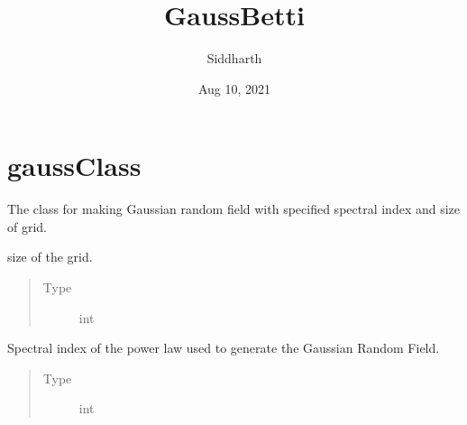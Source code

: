 \documentclass[letterpaper,10pt,english]{sphinxmanual}
\title{GaussBetti}
\date{Aug 10, 2021}
\author{Siddharth}
\begin{document}
\pagestyle{empty}
\sphinxmaketitle
\pagestyle{plain}
\sphinxtableofcontents
\pagestyle{normal}
\label{\detokenize{index::doc}}



\chapter{gaussClass}
\label{\detokenize{gaussClass:gaussclass}}\label{\detokenize{gaussClass:id1}}\label{\detokenize{gaussClass::doc}}\label{\detokenize{gaussClass:module-gaussClass}}

\begin{fulllineitems}
\label{\detokenize{gaussClass:gaussClass.GaussianRandomField}}
\sphinxAtStartPar
The class for making Gaussian random field with specified spectral index and size of grid.

\begin{fulllineitems}
\label{\detokenize{gaussClass:gaussClass.GaussianRandomField.Nzise}}
\sphinxAtStartPar
size of the grid.
\begin{quote}\begin{description}
\item[{Type}] \leavevmode
\sphinxAtStartPar
int

\end{description}\end{quote}

\end{fulllineitems}


\begin{fulllineitems}
\label{\detokenize{gaussClass:gaussClass.GaussianRandomField.n}}
\sphinxAtStartPar
Spectral index of the power law used to generate the Gaussian Random Field.
\begin{quote}\begin{description}
\item[{Type}] \leavevmode
\sphinxAtStartPar
int


\end{description}
\end{quote}
\end{fulllineitems}
\end{fulllineitems}
\end{document}

